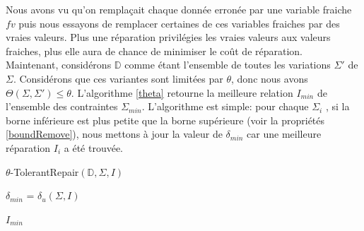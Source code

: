 \documentclass[letterpaper, 12pt]{report}
\theoremstyle{definition}
\begin{document}
Nous avons vu qu'on remplaçait chaque donnée erronée par une variable fraiche $fv$ puis nous essayons de remplacer certaines de ces variables fraiches par des vraies valeurs. Plus une réparation privilégies les vraies valeurs aux valeurs fraiches, plus elle aura de chance de minimiser le coût de réparation.\\

Maintenant, considérons $\mathbb{D}$ comme étant l'ensemble de toutes les variations $\Sigma'$ de $\Sigma$. Considérons que ces variantes sont limitées par $\theta$, donc nous avons $\Theta(\Sigma,\Sigma') \leq \theta$. L'algorithme \ref{theta} retourne la meilleure relation $I_{min}$ de l'ensemble des contraintes $\Sigma_{min}$. L'algorithme est simple: pour chaque $\Sigma_i$ , si la borne inférieure est plus petite que la borne supérieure (voir la propriétés \ref{boundRemove}), nous mettons à jour la valeur de $\delta_{min}$ car une meilleure réparation $I_i$ a été trouvée. \\

\IncMargin{1em}
\begin{algorithm}
\label{theta}

	\DontPrintSemicolon
  \caption{$\theta$-TolerantRepair$(\mathbb{D},\Sigma,I)$}
  \LinesNumbered

    $\delta_{min}$ = $\delta_u(\Sigma,I)$\;

	\Return $I_{min}$

\end{algorithm}\DecMargin{1em}
\end{document}
